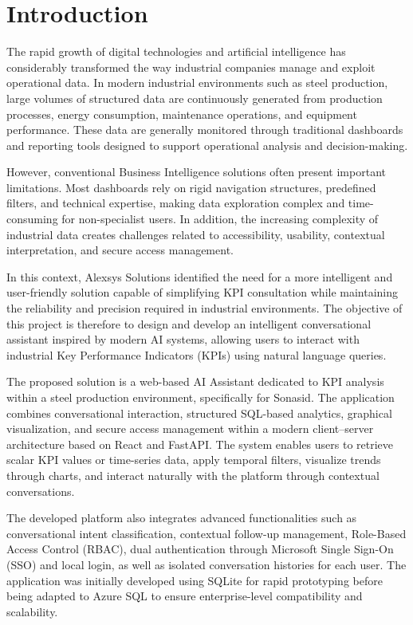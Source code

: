 \chapter{Introduction}

The rapid growth of digital technologies and artificial intelligence has considerably transformed the way industrial companies manage and exploit operational data. In modern industrial environments such as steel production, large volumes of structured data are continuously generated from production processes, energy consumption, maintenance operations, and equipment performance. These data are generally monitored through traditional dashboards and reporting tools designed to support operational analysis and decision-making.

However, conventional Business Intelligence solutions often present important limitations. Most dashboards rely on rigid navigation structures, predefined filters, and technical expertise, making data exploration complex and time-consuming for non-specialist users. In addition, the increasing complexity of industrial data creates challenges related to accessibility, usability, contextual interpretation, and secure access management.

In this context, Alexsys Solutions identified the need for a more intelligent and user-friendly solution capable of simplifying KPI consultation while maintaining the reliability and precision required in industrial environments. The objective of this project is therefore to design and develop an intelligent conversational assistant inspired by modern AI systems, allowing users to interact with industrial Key Performance Indicators (KPIs) using natural language queries.

The proposed solution is a web-based AI Assistant dedicated to KPI analysis within a steel production environment, specifically for Sonasid. The application combines conversational interaction, structured SQL-based analytics, graphical visualization, and secure access management within a modern client--server architecture based on React and FastAPI. The system enables users to retrieve scalar KPI values or time-series data, apply temporal filters, visualize trends through charts, and interact naturally with the platform through contextual conversations.

The developed platform also integrates advanced functionalities such as conversational intent classification, contextual follow-up management, Role-Based Access Control (RBAC), dual authentication through Microsoft Single Sign-On (SSO) and local login, as well as isolated conversation histories for each user. The application was initially developed using SQLite for rapid prototyping before being adapted to Azure SQL to ensure enterprise-level compatibility and scalability.

